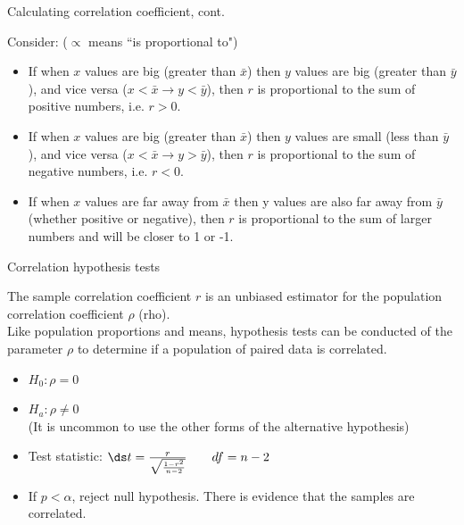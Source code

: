 \documentclass[xcolor=table, aspectratio=169, bigger]{beamer}
\begin{document}
\begin{frame}{Calculating correlation coefficient, cont.}
\begin{block}{}
Consider: ($\propto$ means ``is proportional to")\\
\smallskip
{}
\begin{itemize}
\pause\item If when $x$ values are big (greater than $\bar x$) then $y$ values are big (greater than $\bar y$), and vice versa ($x < \bar x \to y < \bar y$), then $r$ is proportional to the sum of positive numbers, i.e. $r> 0$.
\pause\item If when $x$ values are big (greater than $\bar x$) then $y$ values are small (less than $\bar y$), and vice versa ($x < \bar x \to y > \bar y$), then $r$ is proportional to the sum of negative numbers, i.e. $r < 0$.
\pause\item If when $x$ values are far away from $\bar x$ then y values are also far away from $\bar y$ (whether positive or negative), then $r$ is proportional to the sum of larger numbers and will be closer to 1 or -1.
\end{itemize}
\end{block}
\end{frame}


\begin{frame}{Correlation hypothesis tests}
\begin{block}{}
The sample correlation coefficient $r$ is an unbiased estimator for the population correlation coefficient $\rho$ (rho).\\
\medskip
Like population proportions and means, hypothesis tests can be conducted of the parameter $\rho$ to determine if a population of paired data is correlated.
\begin{itemize}
\pause\item $H_0: \rho = 0$
\pause\item $H_a: \rho \ne 0$\\ (It is uncommon to use the other forms of the alternative hypothesis)
\pause\item Test statistic: $\ds t= \frac r {\sqrt{\frac{1-r^2}{n-2}}} \qquad df = n-2$
\pause\item If $p < \alpha$, reject null hypothesis. There is evidence that the samples are correlated.
\end{itemize}
\end{block}
\end{frame}
\end{document}
